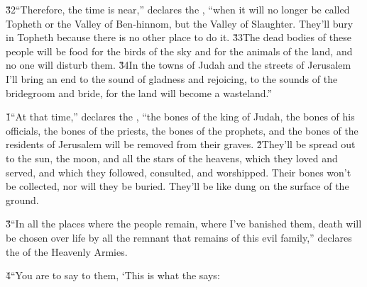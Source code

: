 \v{32}``Therefore, the time is near,'' declares the , ``when it will no longer be called Topheth or the Valley of Ben-hinnom, but the Valley of Slaughter. They'll bury in Topheth because there is no other place to do it. \v{33}The dead bodies of these people will be food for the birds of the sky and for the animals of the land, and no one will disturb them. \v{34}In the towns of Judah and the streets of Jerusalem I'll bring an end to the sound of gladness and rejoicing, to the sounds of the bridegroom and bride, for the land will become a wasteland.''

\v{1}``At that time,'' declares the , ``the bones of the king of Judah, the bones of his officials, the bones of the priests, the bones of the prophets, and the bones of the residents of Jerusalem will be removed from their graves. \v{2}They'll be spread out to the sun, the moon, and all the stars of the heavens, which they loved and served, and which they followed, consulted, and worshipped. Their bones won't be collected, nor will they be buried. They'll be like dung on the surface of the ground.

\v{3}``In all the places where the people remain, where I've banished them, death will be chosen over life by all the remnant that remains of this evil family,'' declares the  of the Heavenly Armies.

\v{4}``You are to say to them, `This is what the  says:

